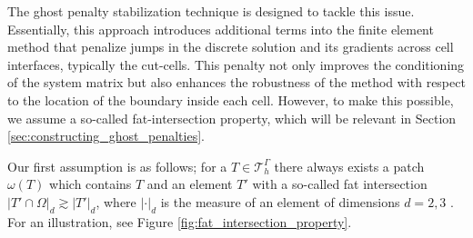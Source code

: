 \documentclass[11pt]{article}
\theoremstyle{remark}
\newcommand{\abs}[1]{\left\lvert #1 \right\rvert}
\numberwithin{equation}{section}
\begin{document}
The ghost penalty stabilization technique is designed to tackle this issue. Essentially, this approach introduces additional terms into the finite element method that penalize jumps in the discrete solution and its gradients across cell interfaces,
typically the cut-cells. This penalty not only improves the conditioning of the system matrix but also enhances the robustness of the method with respect to the location of the boundary inside each cell. However, to make this possible, we assume a
so-called fat-intersection property, which will be relevant in Section \ref{sec:constructing_ghost_penalties}.

Our first assumption is as follows;
for a $T \in \mathcal{T} ^{\Gamma }_{h}$ there always exists a patch $\omega ( T) $ which contains $T$ and an element $T'$ with a so-called fat intersection $
        \abs{ T' \cap \Omega  } _{d} \gtrsim \abs{ T' } _{d}$, where $\abs{ \cdot  }_{d} $ is the measure of an element of dimensions $d =2,3  $ . For an illustration, see Figure \ref{fig:fat_intersection_property}.
\end{document}
